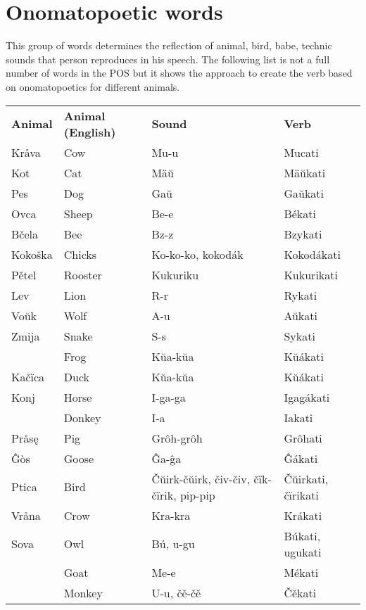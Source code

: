 \section{Onomatopoetic words}

This group of words determines the reflection of animal, bird, babe, technic sounds that person reproduces in his speech. The following list is not a full number of words in the POS but it shows the approach to create the verb based on onomatopoetics for different animals.

\begin{table}
	\begin{tabular}{llp{7em}l}
		\textbf{Animal} & \textbf{Animal (English)} & \textbf{Sound} & \textbf{Verb} \\
		Kråva & Cow & Mu-u & Mucati \\
		Kot & Cat & Mäŭ & Mäŭkati \\
		Pes & Dog & Gaŭ & Gaŭkati \\
		Ovca & Sheep & Be-e & Békati \\
		Bčela & Bee & Bz-z & Bzykati \\
		Kokoška & Chicks & Ko-ko-ko, kokodák & Kokodákati \\
		Pětel & Rooster & Kukuriku & Kukurikati \\
		Lev & Lion & R-r & Rykati \\
		Voŭk & Wolf & A-u & Aŭkati \\
		Zmija & Snake & S-s & Sykati \\
		& Frog & Kŭa-kŭa & Kŭákati \\
		Kačïca & Duck & Kŭa-kŭa & Kŭákati \\
		Konj & Horse & I-ga-ga & Igagákati \\
		& Donkey & I-a & Iakati \\
		Pråsę & Pig & Grôh-grôh & Grôhati \\
		Ĝòs & Goose & Ĝa-ĝa & Ĝákati \\
		Ptica & Bird & Čŭirk-čŭirk, čiv-čiv, čïk-čïrik, pip-pip & Čŭirkati, čïrikati \\
		Vråna & Crow & Kra-kra & Krákati \\
		Sova & Owl & Bú, u-gu & Búkati, ugukati \\
		& Goat & Me-e & Mékati \\
		& Monkey & U-u, čě-čě & Čěkati \\
	\end{tabular}
\end{table}

